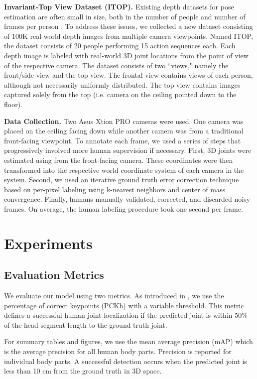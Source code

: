 \documentclass[runningheads]{llncs}
\begin{document}
	\textbf{Invariant-Top View Dataset (ITOP).}
	Existing depth datasets for pose estimation are often small in size, both in the number of people and number of frames per person \cite{ganapathi2010real,ganapathi2012real}. To address these issues, we collected a new dataset consisting of 100K real-world depth images from multiple camera viewpoints. Named ITOP, the dataset consists of 20 people performing 15 action sequences each. Each depth image is labeled with real-world 3D joint locations from the point of view of the respective camera. The dataset consists of two ``views," namely the front/side view and the top view. The frontal view contains  views of each person, although not necessarily uniformly distributed.  The top view contains images captured solely from the top (i.e. camera on the ceiling pointed down to the floor).

	\textbf{Data Collection. }
	Two Asus Xtion PRO cameras were used. One camera was placed on the ceiling facing down while another camera was from a traditional front-facing viewpoint. To annotate each frame, we used a series of steps that progressively involved more human supervision if necessary. First, 3D joints were estimated using \cite{shotton2011real} from the front-facing camera. These coordinates were then transformed into the respective world coordinate system of each camera in the system. Second, we used an iterative ground truth error correction technique based on per-pixel labeling using k-nearest neighbors and center of mass convergence. Finally, humans manually validated, corrected, and discarded noisy frames. On average, the human labeling procedure took one second per frame.

	\section{Experiments}\label{sec:experiments}

	\subsection{Evaluation Metrics}

	We evaluate our model using two metrics. As introduced in \cite{andriluka20142d}, we use the percentage of correct keypoints (PCKh) with a variable threshold.
	This metric defines a successful human joint localization if the predicted joint is within 50\% of the head segment length to the ground truth joint.

	For summary tables and figures, we use the mean average precision (mAP) which is the average precision for all human body parts. Precision is reported for individual body parts. A successful detection occurs when the predicted joint is less than 10 cm from the ground truth in 3D space.
\end{document}
